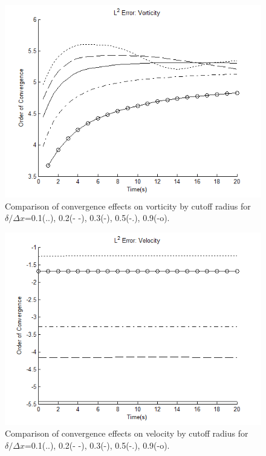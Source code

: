 \documentclass[letterpaper,12pt]{report}
\begin{document}
\begin{figure}
\centering
\includegraphics[width=1\textwidth]{CutoffW.PNG}
\caption{\label{fig:CutoffW}Comparison of convergence effects on vorticity by cutoff radius for $\delta/\Delta x$=0.1(..), 0.2(- -), 0.3(-), 0.5(-.), 0.9(-o).}
\end{figure}
\begin{figure}
\centering
\includegraphics[width=1\textwidth]{CutoffU.PNG}
\caption{\label{fig:CutoffU}Comparison of convergence effects on velocity by cutoff radius for $\delta/\Delta x$=0.1(..), 0.2(- -), 0.3(-), 0.5(-.), 0.9(-o).}
\end{figure}
\end{document}
